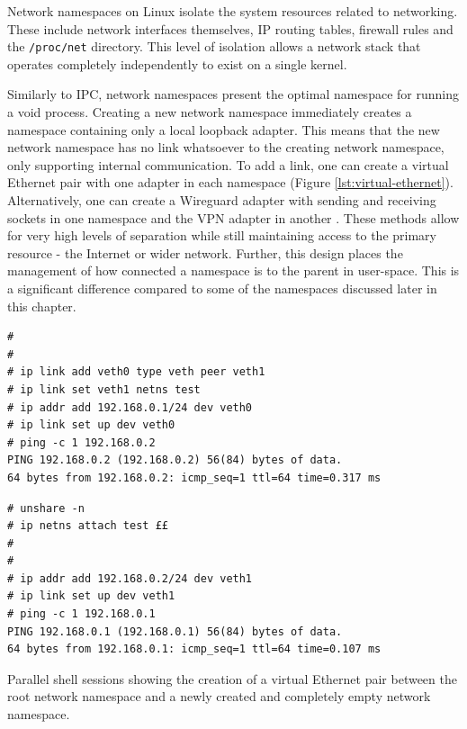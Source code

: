 \documentclass[12pt,a4paper,twoside]{report}
\begin{document}
Network namespaces on Linux isolate the system resources related to networking. These include network interfaces themselves, IP routing tables, firewall rules and the \texttt{/proc/net} directory. This level of isolation allows a network stack that operates completely independently to exist on a single kernel.

Similarly to IPC, network namespaces present the optimal namespace for running a void process. Creating a new network namespace immediately creates a namespace containing only a local loopback adapter. This means that the new network namespace has no link whatsoever to the creating network namespace, only supporting internal communication. To add a link, one can create a virtual Ethernet pair with one adapter in each namespace (Figure \ref{lst:virtual-ethernet}). Alternatively, one can create a Wireguard adapter with sending and receiving sockets in one namespace and the VPN adapter in another \citep[§7.3]{donenfeld_wireguard_2017}. These methods allow for very high levels of separation while still maintaining access to the primary resource - the Internet or wider network. Further, this design places the management of how connected a namespace is to the parent in user-space. This is a significant difference compared to some of the namespaces discussed later in this chapter.

\begin{listing}
\begin{minipage}{.49\textwidth}

\begin{verbatim}
#
#
# ip link add veth0 type veth peer veth1
# ip link set veth1 netns test
# ip addr add 192.168.0.1/24 dev veth0
# ip link set up dev veth0
# ping -c 1 192.168.0.2
PING 192.168.0.2 (192.168.0.2) 56(84) bytes of data.
64 bytes from 192.168.0.2: icmp_seq=1 ttl=64 time=0.317 ms
\end{verbatim}

\end{minipage}\hfill
\begin{minipage}{.49\textwidth}

\begin{verbatim}
# unshare -n
# ip netns attach test ££
#
#
# ip addr add 192.168.0.2/24 dev veth1
# ip link set up dev veth1
# ping -c 1 192.168.0.1
PING 192.168.0.1 (192.168.0.1) 56(84) bytes of data.
64 bytes from 192.168.0.1: icmp_seq=1 ttl=64 time=0.107 ms
\end{verbatim}

\end{minipage}

\caption{Parallel shell sessions showing the creation of a virtual Ethernet pair between the root network namespace and a newly created and completely empty network namespace.}
\label{lst:virtual-ethernet}
\end{listing}
\end{document}

